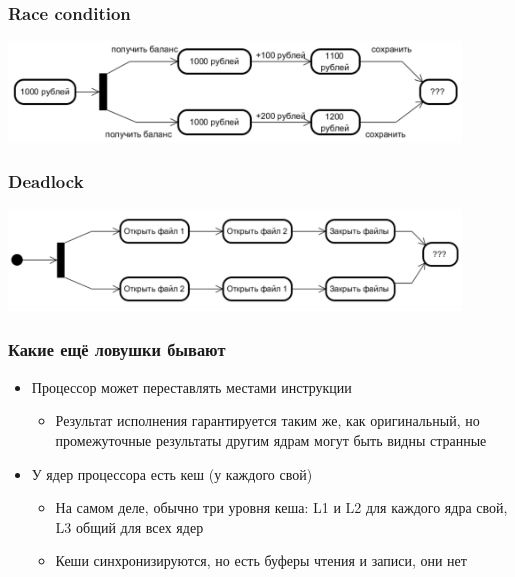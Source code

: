 \documentclass[xetex,mathserif,serif]{beamer}
\begin{document}
	\begin{frame}
		\frametitle{Race condition}
		\begin{center}
			\includegraphics[width=0.9\textwidth]{raceCondition.png}
		\end{center}
	\end{frame}

	\begin{frame}
		\frametitle{Deadlock}
		\begin{center}
			\includegraphics[width=0.9\textwidth]{deadlock.png}
		\end{center}
	\end{frame}

	\begin{frame}
		\frametitle{Какие ещё ловушки бывают}
		\begin{itemize}
			\item Процессор может переставлять местами инструкции
			\begin{itemize}
				\item Результат исполнения гарантируется таким же, как оригинальный, но промежуточные результаты другим 
					ядрам могут быть видны странные
			\end{itemize}
			\item У ядер процессора есть кеш (у каждого свой)
			\begin{itemize}
				\item На самом деле, обычно три уровня кеша: L1 и L2 для каждого ядра свой, L3 общий для всех ядер
				\item Кеши синхронизируются, но есть буферы чтения и записи, они нет
			\end{itemize}
		\end{itemize}
	\end{frame}
\end{document}
